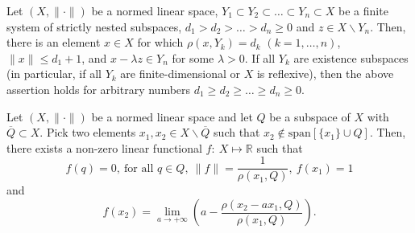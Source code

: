 \documentclass[10pt,a4paper]{amsart}
\begin{document}
\begin{lemma}
\label{lemma1}
Let $(X,\|\cdot\|)$ be a normed linear space, $Y_1\subset Y_2\subset\ldots\subset Y_n\subset X$ be a finite system of strictly nested subspaces, $d_1>d_2>\ldots>d_n\ge0$ and $z \in X\backslash Y_n$. Then, there is an element $x\in X$ for which $\rho(x,Y_k)=d_k$ $(k=1,\ldots,n)$,  $\|x\|\le d_1+1$, and $x-\lambda z\in Y_n$ for some $\lambda>0$. If all $Y_k$ are existence subspaces (in particular, if all $Y_k$ are finite-dimensional or $X$ is reflexive),
then the above assertion holds for arbitrary numbers $d_1 \ge d_2 \ge \ldots\ge d_n \ge 0$.
\end{lemma}

\begin{lemma}
\label{lemma1'}
Let $(X,\|\cdot\|)$ be a normed linear space and let $Q$ be a subspace of $X$ with $\overline Q\subset X$. Pick two elements $x_1,x_2\in X\backslash \overline Q$ such that $x_2\notin \mbox{span} [\{x_1\}\cup Q]$. Then, there exists a non-zero linear functional $f:~X\longmapsto \mathbb R$ such that
\begin{equation}
\label{linearf1}
f(q)=0,~\mbox{for all $q\in Q$},~\|f\|=\frac{1}{\rho(x_1,Q)},~f(x_1)=1
\end{equation}
and
\begin{equation}
\label{linearf2}
f(x_2)=\lim_{a\to+\infty}\left(a-\frac{\rho(x_2-a x_1,Q)}{\rho(x_1,Q)}\right).
\end{equation}
\end{lemma}
\end{document}
